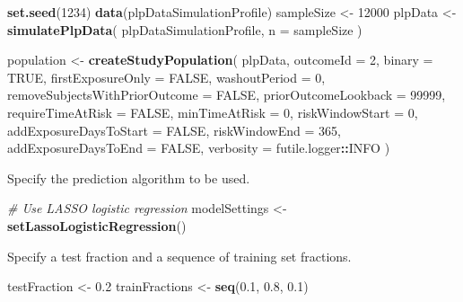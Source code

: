 \documentclass[]{article}
\newenvironment{Shaded}{\begin{snugshade}}{\end{snugshade}}
\newcommand{\KeywordTok}[1]{\textcolor[rgb]{0.13,0.29,0.53}{\textbf{#1}}}
\newcommand{\DataTypeTok}[1]{\textcolor[rgb]{0.13,0.29,0.53}{#1}}
\newcommand{\DecValTok}[1]{\textcolor[rgb]{0.00,0.00,0.81}{#1}}
\newcommand{\FloatTok}[1]{\textcolor[rgb]{0.00,0.00,0.81}{#1}}
\newcommand{\StringTok}[1]{\textcolor[rgb]{0.31,0.60,0.02}{#1}}
\newcommand{\CommentTok}[1]{\textcolor[rgb]{0.56,0.35,0.01}{\textit{#1}}}
\newcommand{\OtherTok}[1]{\textcolor[rgb]{0.56,0.35,0.01}{#1}}
\newcommand{\OperatorTok}[1]{\textcolor[rgb]{0.81,0.36,0.00}{\textbf{#1}}}
\newcommand{\NormalTok}[1]{#1}
\begin{document}
\begin{Shaded}
\begin{Highlighting}[]
\KeywordTok{set.seed}\NormalTok{(}\DecValTok{1234}\NormalTok{)}
\KeywordTok{data}\NormalTok{(plpDataSimulationProfile)}
\NormalTok{sampleSize <-}\StringTok{ }\DecValTok{12000}
\NormalTok{plpData <-}\StringTok{ }\KeywordTok{simulatePlpData}\NormalTok{(}
\NormalTok{  plpDataSimulationProfile,}
  \DataTypeTok{n =}\NormalTok{ sampleSize}
\NormalTok{)}

\NormalTok{population <-}\StringTok{ }\KeywordTok{createStudyPopulation}\NormalTok{(}
\NormalTok{  plpData,}
  \DataTypeTok{outcomeId =} \DecValTok{2}\NormalTok{,}
  \DataTypeTok{binary =} \OtherTok{TRUE}\NormalTok{,}
  \DataTypeTok{firstExposureOnly =} \OtherTok{FALSE}\NormalTok{,}
  \DataTypeTok{washoutPeriod =} \DecValTok{0}\NormalTok{,}
  \DataTypeTok{removeSubjectsWithPriorOutcome =} \OtherTok{FALSE}\NormalTok{,}
  \DataTypeTok{priorOutcomeLookback =} \DecValTok{99999}\NormalTok{,}
  \DataTypeTok{requireTimeAtRisk =} \OtherTok{FALSE}\NormalTok{,}
  \DataTypeTok{minTimeAtRisk =} \DecValTok{0}\NormalTok{,}
  \DataTypeTok{riskWindowStart =} \DecValTok{0}\NormalTok{,}
  \DataTypeTok{addExposureDaysToStart =} \OtherTok{FALSE}\NormalTok{,}
  \DataTypeTok{riskWindowEnd =} \DecValTok{365}\NormalTok{,}
  \DataTypeTok{addExposureDaysToEnd =} \OtherTok{FALSE}\NormalTok{,}
  \DataTypeTok{verbosity =}\NormalTok{ futile.logger}\OperatorTok{::}\NormalTok{INFO}
\NormalTok{)}
\end{Highlighting}
\end{Shaded}

Specify the prediction algorithm to be used.

\begin{Shaded}
\begin{Highlighting}[]
\CommentTok{# Use LASSO logistic regression}
\NormalTok{modelSettings <-}\StringTok{ }\KeywordTok{setLassoLogisticRegression}\NormalTok{()}
\end{Highlighting}
\end{Shaded}

Specify a test fraction and a sequence of training set fractions.

\begin{Shaded}
\begin{Highlighting}[]
\NormalTok{testFraction <-}\StringTok{ }\FloatTok{0.2}
\NormalTok{trainFractions <-}\StringTok{ }\KeywordTok{seq}\NormalTok{(}\FloatTok{0.1}\NormalTok{, }\FloatTok{0.8}\NormalTok{, }\FloatTok{0.1}\NormalTok{)}
\end{Highlighting}
\end{Shaded}
\end{document}
